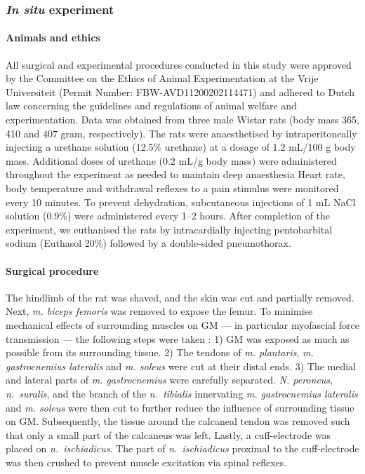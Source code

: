 \documentclass[
  10pt,
  letterpaper,
]{article}
\begin{document}
\subsubsection{\texorpdfstring{\emph{In situ}
experiment}{In situ experiment}}\label{in-situ-experiment}

\paragraph{Animals and ethics}\label{animals-and-ethics}

All surgical and experimental procedures conducted in this study were
approved by the Committee on the Ethics of Animal Experimentation at the
Vrije Universiteit (Permit Number: FBW-AVD11200202114471) and adhered to
Dutch law concerning the guidelines and regulations of animal welfare
and experimentation. Data was obtained from three male Wistar rats (body
mass 365, 410 and 407 gram, respectively). The rats were anaesthetised
by intraperitoneally injecting a urethane solution (12.5\% urethane) at
a dosage of 1.2 mL/100 g body mass. Additional doses of urethane (0.2
mL/g body mass) were administered throughout the experiment as needed to
maintain deep anaesthesia Heart rate, body temperature and withdrawal
reflexes to a pain stimulus were monitored every 10 minutes. To prevent
dehydration, subcutaneous injections of 1 mL NaCl solution (0.9\%) were
administered every 1--2 hours. After completion of the experiment, we
euthanised the rats by intracardially injecting pentobarbital sodium
(Euthasol 20\%) followed by a double-sided pneumothorax.

\paragraph{Surgical procedure}\label{surgical-procedure}

The hindlimb of the rat was shaved, and the skin was cut and partially
removed. Next, \emph{m. biceps femoris} was removed to expose the femur.
To minimise mechanical effects of surrounding muscles on GM --- in
particular myofascial force transmission --- the following steps were
taken \citep[see][]{rijkelijkhuizen_extramuscular_2005}: 1) GM was
exposed as much as possible from its surrounding tissue. 2) The tendons
of \emph{m. plantaris}, \emph{m. gastrocnemius lateralis} and \emph{m.
soleus} were cut at their distal ends. 3) The medial and lateral parts
of \emph{m. gastrocnemius} were carefully separated. \emph{N. peroneus},
\emph{n.~suralis}, and the branch of the \emph{n.~tibialis} innervating
\emph{m. gastrocnemius lateralis} and \emph{m. soleus} were then cut to
further reduce the influence of surrounding tissue on GM. Subsequently,
the tissue around the calcaneal tendon was removed such that only a
small part of the calcaneus was left. Lastly, a cuff-electrode was
placed on \emph{n.~ischiadicus}. The part of \emph{n.~ischiadicus}
proximal to the cuff-electrode was then crushed to prevent muscle
excitation via spinal reflexes.
\end{document}
